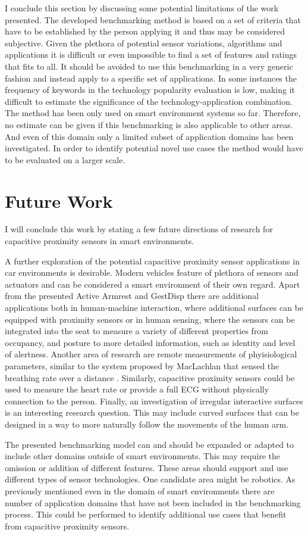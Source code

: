 I conclude this section by discussing some potential limitations of the work presented. The developed benchmarking method is based on a set of criteria that have to be established by the person applying it and thus may be considered subjective. Given the plethora of potential sensor variations, algorithms and applications it is difficult or even impossible to find a set of features and ratings that fits to all. It should be avoided to use this benchmarking in a very generic fashion and instead apply to a specific set of applications. In some instances the frequency of keywords in the technology popularity evaluation is low, making it difficult to estimate the significance of the technology-application combination. The method has been only used on smart environment systems so far. Therefore, no estimate can be given if this benchmarking is also applicable to other areas. And even of this domain only a limited subset of application domains has been investigated. In order to identify potential novel use cases the method would have to be evaluated on a larger scale.

\section{Future Work}
I will conclude this work by stating a few future directions of research for capacitive proximity sensors in smart environments.

A further exploration of the potential capacitive proximity sensor applications in car environments is desirable. Modern vehicles feature of plethora of sensors and actuators and can be considered a smart environment of their own regard. Apart from the presented Active Armrest and GestDisp there are additional applications both in human-machine interaction, where additional surfaces can be equipped with proximity sensors or in human sensing, where the sensors can be integrated into the seat to measure a variety of different properties from occupancy, and posture to more detailed information, such as identity and level of alertness. Another area of research are remote measurements of phyisiological parameters, similar to the system proposed by MacLachlan that sensed the breathing rate over a distance \cite{MacLachlan2004}. Similarly, capacitive proximity sensors could be used to measure the heart rate or provide a full ECG without physically connection to the person. Finally, an investigation of irregular interactive surfaces is an interesting research question. This may include curved surfaces that can be designed in a way to more naturally follow the movements of the human arm.

The presented benchmarking model can and should be expanded or adapted to include other domains outside of smart environments. This may require the omission or addition of different features. These areas should support and use different types of sensor technologies. One candidate area might be robotics. As previously mentioned even in the domain of smart environments there are number of application domains that have not been included in the benchmarking process. This could be performed to identify additional use cases that benefit from capacitive proximity sensors.



